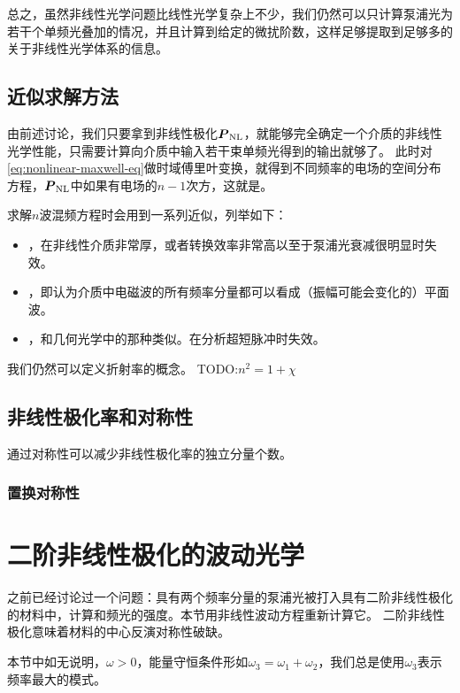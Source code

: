 总之，虽然非线性光学问题比线性光学复杂上不少，我们仍然可以只计算泵浦光为若干个单频光叠加的情况，并且计算到给定的微扰阶数，这样足够提取到足够多的关于非线性光学体系的信息。

\subsection{近似求解方法}

由前述讨论，我们只要拿到非线性极化$\vb*{P}_\text{NL}$，就能够完全确定一个介质的非线性光学性能，只需要计算向介质中输入若干束单频光得到的输出就够了。
此时对\eqref{eq:nonlinear-maxwell-eq}做时域傅里叶变换，就得到不同频率的电场的空间分布方程，$\vb*{P}_\text{NL}$中如果有电场的$n-1$次方，这就是。

求解$n$波混频方程时会用到一系列近似，列举如下：
\begin{itemize}
    \item {}，在非线性介质非常厚，或者转换效率非常高以至于泵浦光衰减很明显时失效。
    \item {}，即认为介质中电磁波的所有频率分量都可以看成（振幅可能会变化的）平面波。
    \item {}，和几何光学中的那种类似。在分析超短脉冲时失效。
\end{itemize}

我们仍然可以定义折射率的概念。
TODO:$n^2 = 1 + \chi$

\subsection{非线性极化率和对称性}

通过对称性可以减少非线性极化率的独立分量个数。

\subsubsection{置换对称性}


\section{二阶非线性极化的波动光学}\label{sec:chi-2-wave}

之前已经讨论过一个问题：具有两个频率分量的泵浦光被打入具有二阶非线性极化的材料中，计算和频光的强度。本节用非线性波动方程重新计算它。
二阶非线性极化意味着材料的中心反演对称性破缺。

本节中如无说明，$\omega>0$，能量守恒条件形如$\omega_3 = \omega_1 + \omega_2$，我们总是使用$\omega_3$表示频率最大的模式。

